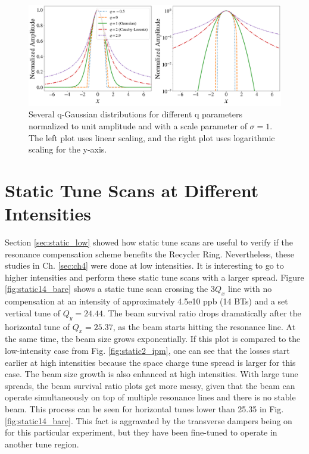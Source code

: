 \begin{figure}[H]
    \centering
    \includegraphics[width=\textwidth,keepaspectratio]{chapter6/qgaussians.png}
    \caption{Several q-Gaussian distributions for different q parameters normalized to unit amplitude and with a scale parameter of $\sigma=1$. The left plot uses linear scaling, and the right plot uses logarithmic scaling for the y-axis.}
    \label{fig:qgaussians}
   \vspace{-1.25em}
\end{figure}


\section{\label{sec:static_high}Static Tune Scans at Different Intensities}

Section \ref{sec:static_low} showed how static tune scans are useful to verify if the resonance compensation scheme benefits the Recycler Ring. Nevertheless, these studies in Ch. \ref{sec:ch4} were done at low intensities. It is interesting to go to higher intensities and perform these static tune scans with a larger spread. Figure \ref{fig:static14_bare} shows a static tune scan crossing the $3Q_x$ line with no compensation at an intensity of approximately 4.5e10 ppb (14 BTs) and a set vertical tune of $Q_y=24.44$. The beam survival ratio drops dramatically after the horizontal tune of $Q_x=25.37$, as the beam starts hitting the resonance line. At the same time, the beam size grows exponentially. If this plot is compared to the low-intensity case from Fig. \ref{fig:static2_ipm}, one can see that the losses start earlier at high intensities because the space charge tune spread is larger for this case. The beam size growth is also enhanced at high intensities. With large tune spreads, the beam survival ratio plots get more messy, given that the beam can operate simultaneously on top of multiple resonance lines and there is no stable beam. This process can be seen for horizontal tunes lower than 25.35 in Fig. \ref{fig:static14_bare}. This fact is aggravated by the transverse dampers being on for this particular experiment, but they have been fine-tuned to operate in another tune region. 

